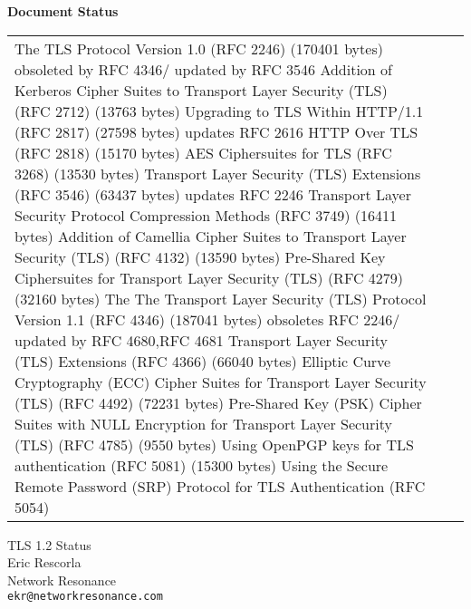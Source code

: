 \documentclass[fancybox]{seminar}
\newcommand{\heading}[1]{%
  \begin{center}
    \large\bf
    #1
  \end{center}
  \vspace{.4 in}}
\begin{document}
\begin{slide}
\heading{Document Status}

{\tiny
\begin{tabular}{|p{1.5 in}|p{1.4 in}|p{.7 in}|}
\hline
The TLS Protocol Version 1.0 (RFC 2246) (170401 bytes) obsoleted by RFC 4346/ updated by RFC 3546
Addition of Kerberos Cipher Suites to Transport Layer Security (TLS) (RFC 2712) (13763 bytes) 
Upgrading to TLS Within HTTP/1.1 (RFC 2817) (27598 bytes) updates RFC 2616
HTTP Over TLS (RFC 2818) (15170 bytes) 
AES Ciphersuites for TLS (RFC 3268) (13530 bytes) 
Transport Layer Security (TLS) Extensions (RFC 3546) (63437 bytes) updates RFC 2246
Transport Layer Security Protocol Compression Methods (RFC 3749) (16411 bytes) 
Addition of Camellia Cipher Suites to Transport Layer Security (TLS) (RFC 4132) (13590 bytes) 
Pre-Shared Key Ciphersuites for Transport Layer Security (TLS) (RFC 4279) (32160 bytes) 
The The Transport Layer Security (TLS) Protocol Version 1.1 (RFC 4346) (187041 bytes) obsoletes RFC 2246/ updated by RFC 4680,RFC 4681
Transport Layer Security (TLS) Extensions (RFC 4366) (66040 bytes) 
Elliptic Curve Cryptography (ECC) Cipher Suites for Transport Layer Security (TLS) (RFC 4492) (72231 bytes) 
Pre-Shared Key (PSK) Cipher Suites with NULL Encryption for Transport Layer Security (TLS) (RFC 4785) (9550 bytes) 
Using OpenPGP keys for TLS authentication (RFC 5081) (15300 bytes) 
Using the Secure Remote Password (SRP) Protocol for TLS Authentication (RFC 5054) 
\end{tabular}
}
\end{slide}

\begin{slide}
\begin{center}
\LARGE{{\bf}TLS 1.2 Status}\\

\vspace{.3 in}
\large{Eric Rescorla}\\
\large{Network Resonance}\\
\large{\texttt{ekr@networkresonance.com}}

\end{center}
\end{slide}
\end{document}
